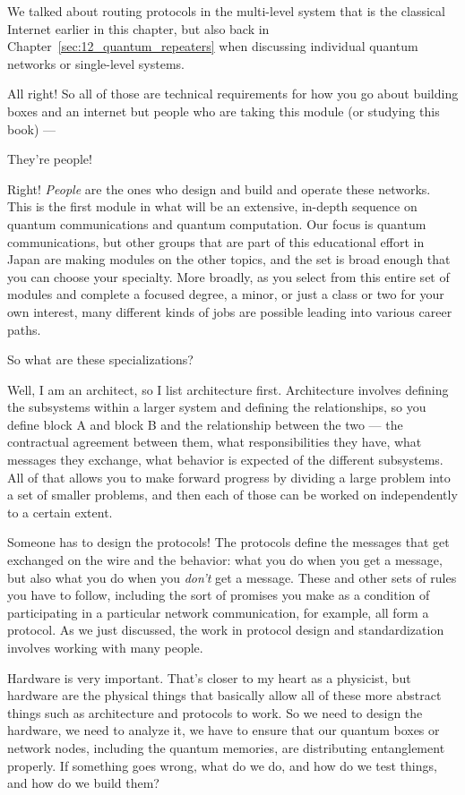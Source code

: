 \rrr We talked about routing protocols in the multi-level system that is the classical Internet earlier in this chapter, but also back in Chapter~\ref{sec:12_quantum_repeaters} when discussing individual quantum networks or single-level systems.

All right! So all of those are technical requirements for how you go about building boxes and an internet but people who are taking this module (or studying this book) ---

\mmm They're people! 

\rrr Right! \emph{People} are the ones who design and build and operate these networks. This is the first module in what will be an extensive, in-depth sequence on quantum communications and quantum computation.  Our focus is quantum communications, but other groups that are part of this educational effort in Japan are making modules on the other topics, and the set is broad enough that you can choose your specialty. More broadly, as you select from this entire set of modules and complete a focused degree, a minor, or just a class or two for your own interest, many different kinds of jobs are possible leading into various career paths.

\mmm So what are these specializations?

\rrr Well, I am an architect, so I list architecture first. Architecture involves defining the subsystems within a larger system and defining the relationships, so you define block A and block B and the relationship between the two --- the contractual agreement between them, what responsibilities they have, what messages they exchange, what behavior is expected of the different subsystems. All of that allows you to make forward progress by dividing a large problem into a set of smaller problems, and then each of those can be worked on independently to a certain extent.

Someone has to design the protocols! The protocols define the messages that get exchanged on the wire and the behavior: what you do when you get a message, but also what you do when you \emph{don't} get a message. These and other sets of rules you have to follow, including the sort of promises you make as a condition of participating in a particular network communication, for example, all form a protocol.  As we just discussed, the work in protocol design and standardization involves working with many people.

\mmm Hardware is very important. That's closer to my heart as a physicist, but hardware are the physical things that basically allow all of these more abstract things such as architecture and protocols to work. So we need to design the hardware, we need to analyze it, we have to ensure that our quantum boxes or network nodes, including the quantum memories, are distributing entanglement properly. If something goes wrong, what do we do, and how do we test things, and how do we build them?

